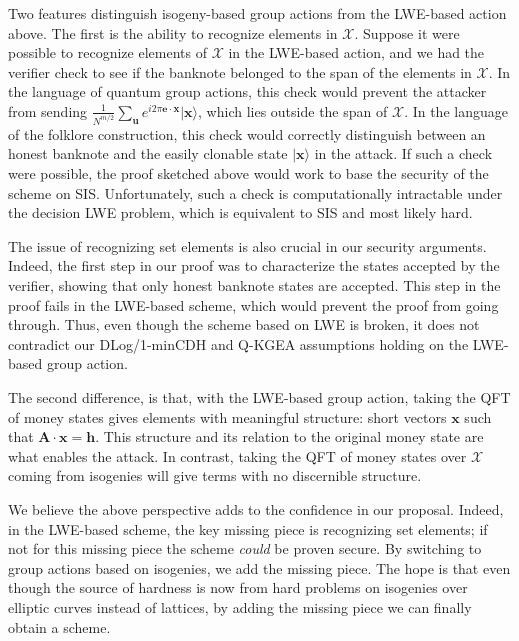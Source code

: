 \documentclass{article}\usepackage[a4paper,margin=20mm]{geometry}
\numberwithin{theorem}{section}
\numberwithin{equation}{section}
\newcommand{\ev}{{\mathbf{e}}}
\newcommand{\hv}{{\mathbf{h}}}
\newcommand{\uv}{{\mathbf{u}}}
\newcommand{\xv}{{\mathbf{x}}}
\newcommand{\Am}{{\mathbf{A}}}
\newcommand{\Xs}{{\mathcal{X}}}
\begin{document}
Two features distinguish isogeny-based group actions from the LWE-based action above. The first is the ability to recognize elements in $\Xs$. Suppose it were possible to recognize elements of $\Xs$ in the LWE-based action, and we had the verifier check to see if the banknote belonged to the span of the elements in $\Xs$. In the language of quantum group actions, this check would prevent the attacker from sending $\frac{1}{N^{m/2}}\sum_\uv e^{i2\pi\ev\cdot\xv}|\xv\rangle$, which lies outside the span of $\Xs$. In the language of the folklore construction, this check would correctly distinguish between an honest banknote and the easily clonable state $|\xv\rangle$ in the attack. If such a check were possible, the proof sketched above would work to base the security of the scheme on SIS. Unfortunately, such a check is computationally intractable under the decision LWE problem, which is equivalent to SIS and most likely hard.

The issue of recognizing set elements is also crucial in our security arguments. Indeed, the first step in our proof was to characterize the states accepted by the verifier, showing that only honest banknote states are accepted. This step in the proof fails in the LWE-based scheme, which would prevent the proof from going through. Thus, even though the scheme based on LWE is broken, it does not contradict our DLog/1-minCDH and Q-KGEA assumptions holding on the LWE-based group action.

The second difference, is that, with the LWE-based group action, taking the QFT of money states gives elements with meaningful structure: short vectors $\xv$ such that $\Am\cdot\xv=\hv$. This structure and its relation to the original money state are what enables the attack. In contrast, taking the QFT of money states over $\Xs$ coming from isogenies will give terms with no discernible structure.

We believe the above perspective adds to the confidence in our proposal. Indeed, in the LWE-based scheme, the key missing piece is recognizing set elements; if not for this missing piece the scheme \emph{could} be proven secure. By switching to group actions based on isogenies, we add the missing piece. The hope is that even though the source of hardness is now from hard problems on isogenies over elliptic curves instead of lattices, by adding the missing piece we can finally obtain a scheme.


\newpage







%
%
\end{document}
